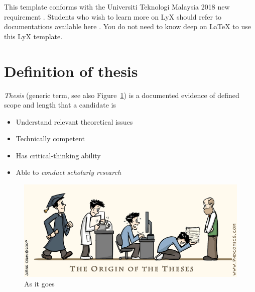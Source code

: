 \documentclass[oneside]{utmthesis}
\begin{document}
This template conforms with the Universiti Teknologi Malaysia 2018 new requirement \cite{utm:thesis:manual}.
Students who wish to learn more on LyX should refer to documentations
available here \cite{lyx:download}. You do not need to know deep
on LaTeX \cite{latex:wikibook} to use this LyX template.

\section{Definition of thesis }

\noindent \emph{Thesis} (generic term, see also Figure~\ref{fig1})
is a documented evidence of defined scope and length that a candidate
is 
\begin{itemize}
\item Understand relevant theoretical issues
\item Technically competent
\item Has critical-thinking ability
\item Able to \emph{conduct scholarly research}
\end{itemize}

\begin{figure}[h]
\begin{centering}
\includegraphics[width=1\textwidth]{./figs/pasted13}
\par\end{centering}
\caption{As it goes}
\label{fig1}

\end{figure}
\end{document}
